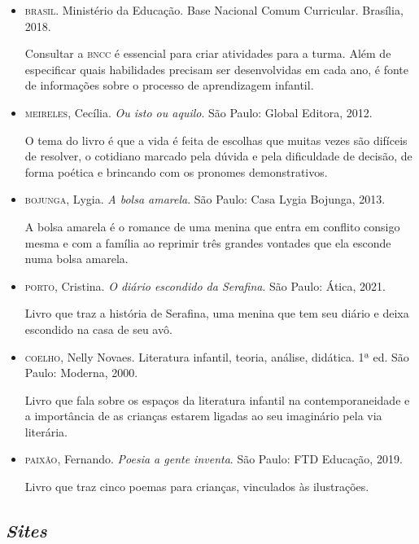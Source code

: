 \documentclass[11pt]{extarticle}
\begin{document}
\begin{itemize}
\item \textsc{brasil}. Ministério da Educação. Base Nacional Comum Curricular. Brasília, 2018.

Consultar a \textsc{bncc} é essencial para criar atividades para a turma. Além de especificar quais habilidades precisam ser desenvolvidas em cada ano, é fonte de informações sobre o processo de aprendizagem infantil. 

\item \textsc{meireles}, Cecília. \textit{Ou isto ou aquilo}. São Paulo: Global Editora, 2012.

O tema do livro é que a vida é feita de escolhas que muitas vezes são difíceis de resolver, o cotidiano marcado pela dúvida e pela dificuldade de decisão, de forma poética e brincando com os pronomes demonstrativos.

\item \textsc{bojunga}, Lygia. \textit{A bolsa amarela}. São Paulo: Casa Lygia Bojunga, 2013.

A bolsa amarela é o romance de uma menina que entra em conflito consigo mesma e com a família ao reprimir três grandes vontades que ela esconde numa bolsa amarela.

\item \textsc{porto}, Cristina. \textit{O diário escondido da Serafina}. São Paulo: Ática, 2021.

Livro que traz a história de Serafina, uma menina que tem seu diário e deixa escondido na casa de seu avô.

\item \textsc{coelho}, Nelly Novaes. Literatura infantil, teoria, análise, didática. 1ª ed. São Paulo: Moderna, 2000.

Livro que fala sobre os espaços da literatura infantil na contemporaneidade e a importância de as crianças estarem ligadas ao seu imaginário pela via literária.

\item \textsc{paixão}, Fernando. \textit{Poesia a gente inventa}. São Paulo: FTD Educação, 2019.

Livro que traz cinco poemas para crianças, vinculados às ilustrações.

\end{itemize}

\subsection{\textit{Sites}}
\end{document}
